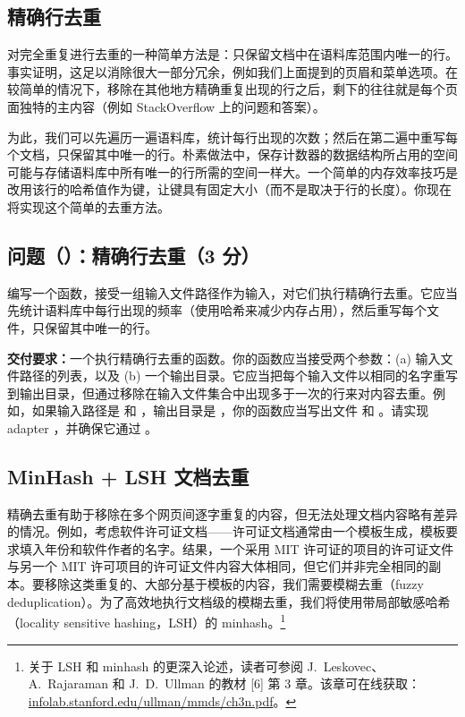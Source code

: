 \subsection{精确行去重}

对完全重复进行去重的一种简单方法是：只保留文档中在语料库范围内唯一的行。事实证明，这足以消除很大一部分冗余，例如我们上面提到的页眉和菜单选项。在较简单的情况下，移除在其他地方精确重复出现的行之后，剩下的往往就是每个页面独特的主内容（例如 StackOverflow 上的问题和答案）。

为此，我们可以先遍历一遍语料库，统计每行出现的次数；然后在第二遍中重写每个文档，只保留其中唯一的行。朴素做法中，保存计数器的数据结构所占用的空间可能与存储语料库中所有唯一的行所需的空间一样大。一个简单的内存效率技巧是改用该行的哈希值作为键，让键具有固定大小（而不是取决于行的长度）。你现在将实现这个简单的去重方法。

\subsection*{问题（）：精确行去重（3 分）}

编写一个函数，接受一组输入文件路径作为输入，对它们执行精确行去重。它应当先统计语料库中每行出现的频率（使用哈希来减少内存占用），然后重写每个文件，只保留其中唯一的行。

\textbf{交付要求：}一个执行精确行去重的函数。你的函数应当接受两个参数：(a) 输入文件路径的列表，以及 (b) 一个输出目录。它应当把每个输入文件以相同的名字重写到输出目录，但通过移除在输入文件集合中出现多于一次的行来对内容去重。例如，如果输入路径是  和 ，输出目录是 ，你的函数应当写出文件  和 。请实现 adapter ，并确保它通过 。

\subsection{MinHash + LSH 文档去重}

精确去重有助于移除在多个网页间逐字重复的内容，但无法处理文档内容略有差异的情况。例如，考虑软件许可证文档——许可证文档通常由一个模板生成，模板要求填入年份和软件作者的名字。结果，一个采用 MIT 许可证的项目的许可证文件与另一个 MIT 许可项目的许可证文件内容大体相同，但它们并非完全相同的副本。要移除这类重复的、大部分基于模板的内容，我们需要模糊去重（fuzzy deduplication）。为了高效地执行文档级的模糊去重，我们将使用带局部敏感哈希（locality sensitive hashing，LSH）的 minhash。\footnote{关于 LSH 和 minhash 的更深入论述，读者可参阅 J.~Leskovec、A.~Rajaraman 和 J.~D.~Ullman 的教材 [6] 第 3 章。该章可在线获取：\url{infolab.stanford.edu/ullman/mmds/ch3n.pdf}。}

